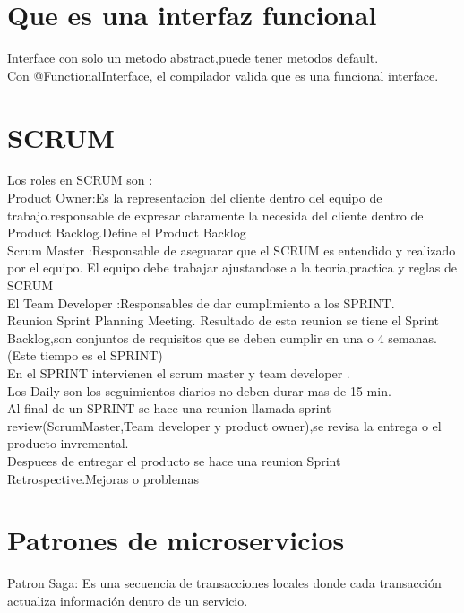 \section{Que es una interfaz funcional}
Interface con solo un metodo abstract,puede tener metodos default.\\
Con @FunctionalInterface, el compilador valida que es una funcional interface.
\section{SCRUM}
Los roles en SCRUM son :\\
 Product Owner:Es la representacion del cliente dentro del equipo de trabajo.responsable de expresar
 claramente la necesida del cliente dentro del Product Backlog.Define el Product Backlog\\
Scrum Master :Responsable de aseguarar que el SCRUM es entendido y realizado por el equipo.
El equipo debe trabajar ajustandose a la teoria,practica y reglas de SCRUM\\
El Team Developer :Responsables de dar cumplimiento a los SPRINT.\\
Reunion Sprint Planning Meeting.
Resultado de esta reunion se tiene el Sprint Backlog,son conjuntos de requisitos que se deben cumplir en una o 4 semanas.(Este tiempo es el SPRINT)\\
En el SPRINT intervienen el scrum master y team developer .\\
Los Daily son los seguimientos diarios no deben durar mas de 15 min.\\
Al final de un SPRINT se hace una reunion llamada sprint review(ScrumMaster,Team developer y product owner),se revisa la entrega o el producto invremental.\\
 Despuees de entregar el producto se hace una reunion Sprint Retrospective.Mejoras o problemas\\
 \section{Patrones de microservicios}
 Patron Saga: Es una secuencia de transacciones locales donde cada transacci\'on  actualiza informaci\'on 
 dentro de un servicio.
